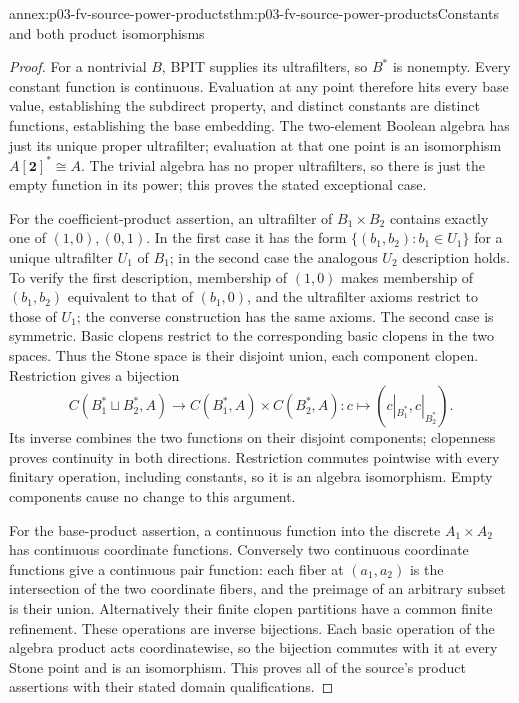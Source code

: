 \begin{annexitem}{annex:p03-fv-source-power-products}{thm:p03-fv-source-power-products}{Constants and both product isomorphisms}
\begin{proof}
For a nontrivial \(B\), BPIT supplies its ultrafilters, so \(B^*\)
is nonempty. Every constant function is continuous. Evaluation at any point
therefore hits every base value, establishing the subdirect property, and
distinct constants are distinct functions, establishing the base embedding.
The two-element Boolean algebra has just its unique proper ultrafilter;
evaluation at that one point is an isomorphism \(A[\mathbf2]^*\cong A\).
The trivial algebra has no proper ultrafilters, so there is just the empty
function in its power; this proves the stated exceptional case.

For the coefficient-product assertion, an ultrafilter of \(B_1\times B_2\)
contains exactly one of \((1,0),(0,1)\). In the first case it has the
form \(\{(b_1,b_2):b_1\in U_1\}\) for a unique ultrafilter \(U_1\)
of \(B_1\); in the second case the analogous \(U_2\) description
holds. To verify the first description, membership of \((1,0)\) makes
membership of \((b_1,b_2)\) equivalent to that of \((b_1,0)\),
and the ultrafilter axioms restrict to those of \(U_1\); the converse
construction has the same axioms. The second case is symmetric. Basic
clopens restrict to the corresponding basic clopens in the two spaces.
Thus the Stone space is their disjoint union, each component clopen.
Restriction gives a bijection
\[
 C(B_1^*\sqcup B_2^*,A)\longrightarrow
                       C(B_1^*,A)\times C(B_2^*,A):
              c\longmapsto(c|_{B_1^*},c|_{B_2^*}).
\]
Its inverse combines the two functions on their disjoint components;
clopenness proves continuity in both directions. Restriction commutes
pointwise with every finitary operation, including constants, so it is an
algebra isomorphism. Empty components cause no change to this argument.

For the base-product assertion, a continuous function into the discrete
\(A_1\times A_2\) has continuous coordinate functions. Conversely two
continuous coordinate functions give a continuous pair function: each
fiber at \((a_1,a_2)\) is the intersection of the two coordinate fibers,
and the preimage of an arbitrary subset is their union. Alternatively their
finite clopen partitions have a common finite refinement. These operations
are inverse bijections. Each basic operation of the algebra product acts
coordinatewise, so the bijection commutes with it at every Stone point and
is an isomorphism. This proves all of the source's product assertions with
their stated domain qualifications.
\end{proof}
\end{annexitem}

